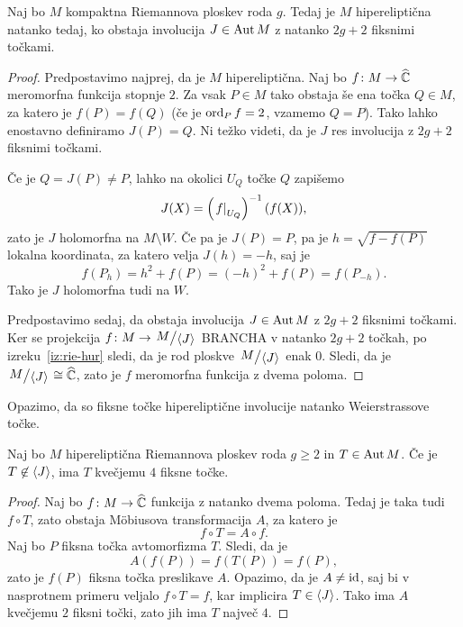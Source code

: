 \begin{trditev}
Naj bo $M$ kompaktna Riemannova ploskev roda $g$. Tedaj je $M$
hipereliptična natanko tedaj, ko obstaja involucija $J \in \operatorname{Aut} M$
z natanko $2g + 2$ fiksnimi točkami.
\end{trditev}

\begin{proof}
Predpostavimo najprej, da je $M$ hipereliptična. Naj bo
$f \colon M \to \widehat{\mathbb{C}}$ meromorfna funkcija stopnje $2$. Za vsak
$P \in M$ tako obstaja še ena točka $Q \in M$, za katero je
$f(P) = f(Q)$ (če je $\operatorname{ord}_P f = 2$, vzamemo $Q=P$). Tako lahko
enostavno definiramo $J(P) = Q$. Ni težko videti, da je $J$
res involucija z $2g + 2$ fiksnimi točkami.

Če je $Q = J(P) \ne P$, lahko na okolici $U_Q$ točke $Q$ zapišemo
\[
J(X) = \left(\left. f\right|_{U_Q}^{}\right)^{-1}(f(X)),
\]
zato je $J$ holomorfna na $M \setminus W$. Če pa je $J(P) = P$, pa
je $h = \sqrt{f - f(P)}$ lokalna koordinata, za katero velja
$J(h) = -h$, saj je
\[
f(P_h) = h^2 + f(P) = (-h)^2 + f(P) = f(P_{-h}).
\]
Tako je $J$ holomorfna tudi na $W$.

Predpostavimo sedaj, da obstaja involucija $J \in \operatorname{Aut} M$ z
$2g + 2$ fiksnimi točkami. Ker se projekcija
$f \colon M \to \kvoc{M}{\skl{J}}$ BRANCHA v natanko $2g + 2$
točkah, po izreku~\ref{iz:rie-hur} sledi, da je rod ploskve
$\kvoc{M}{\skl{J}}$ enak $0$. Sledi, da je
$\kvoc{M}{\skl{J}} \cong \rs$, zato je $f$ meromorfna funkcija z
dvema poloma.
\end{proof}

Opazimo, da so fiksne točke hipereliptične involucije natanko
Weierstrassove točke.

\begin{trditev}
Naj bo $M$ hipereliptična Riemannova ploskev roda $g \geq 2$ in
$T \in \operatorname{Aut} M$. Če je $T \not \in \left\langle J\right\rangle$, ima $T$ kvečjemu $4$
fiksne točke.
\end{trditev}

\begin{proof}
Naj bo $f \colon M \to \widehat{\mathbb{C}}$ funkcija z natanko dvema poloma. Tedaj
je taka tudi $f \circ T$, zato obstaja Möbiusova transformacija
$A$, za katero je
\[
f \circ T = A \circ f.
\]
Naj bo $P$ fiksna točka avtomorfizma $T$. Sledi, da je
\[
A(f(P)) = f(T(P)) = f(P),
\]
zato je $f(P)$ fiksna točka preslikave $A$. Opazimo, da je
$A \ne \operatorname{id}$, saj bi v nasprotnem primeru veljalo $f \circ T = f$,
kar implicira $T \in \left\langle J\right\rangle$. Tako ima $A$ kvečjemu $2$ fiksni
točki, zato jih ima $T$ največ $4$.
\end{proof}
